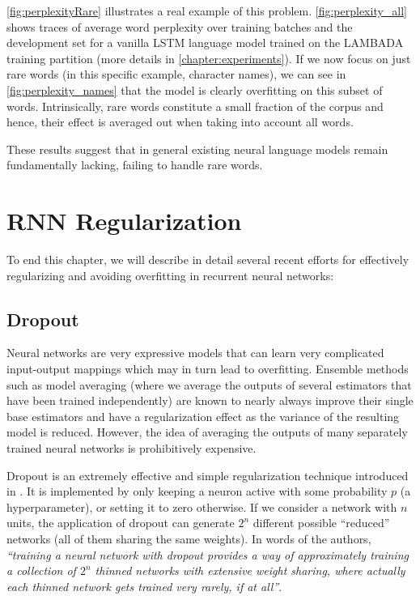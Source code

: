 \autoref{fig:perplexityRare} illustrates a real example of this problem. \autoref{fig:perplexity_all} shows traces of average word perplexity over training batches and the development set for a vanilla LSTM language model trained on the LAMBADA training partition (more details in \autoref{chapter:experiments}). If we now focus on just rare words (in this specific example, character names), we can see in \autoref{fig:perplexity_names} that the model is clearly overfitting on this subset of words. Intrinsically, rare words constitute a small fraction of the corpus and hence, their effect is averaged out when taking into account all words.

These results suggest that in general existing neural language models remain fundamentally lacking, failing to handle rare words.

\section{RNN Regularization}
\label{sec:rnnRegularization}

To end this chapter, we will describe in detail several recent efforts for effectively regularizing and avoiding overfitting in recurrent neural networks:

\subsection{Dropout}

Neural networks are very expressive models that can learn very complicated input-output mappings which may in turn lead to overfitting. Ensemble methods such as model averaging (where we average the outputs of several estimators that have been trained independently) are known to nearly always improve their single base estimators and have a regularization effect as the variance of the resulting model is reduced. However, the idea of averaging the outputs of many separately trained neural networks is prohibitively expensive. 

Dropout is an extremely effective and simple regularization technique introduced in \cite{srivastava14a}. It is implemented by only keeping a neuron active with some probability $p$ (a hyperparameter), or setting it to zero otherwise. If we consider a network with $n$ units, the application of dropout can generate $2^n$ different possible ``reduced'' networks (all of them sharing the same weights). In words of the authors, \textit{``training a neural network with dropout provides a way of approximately training a collection of $2^n$ thinned networks with extensive weight sharing, where actually each thinned network gets trained very rarely, if at all''}.

